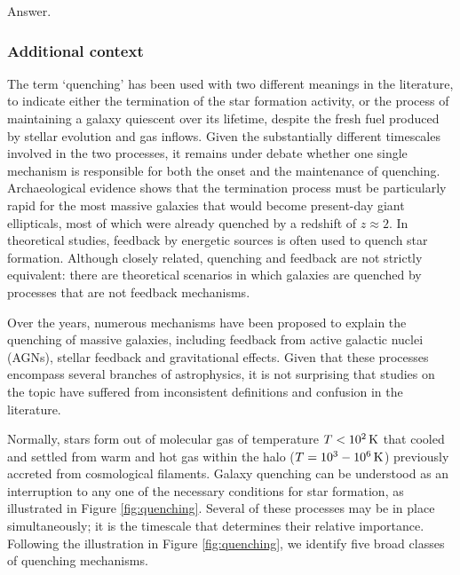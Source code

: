 \documentclass[a4paper,11pt]{article}
\begin{document}
Answer.

\subsubsection{Additional context}

The term `quenching' has been used with two different meanings in the literature, to indicate either the termination of the star formation activity, or the process of maintaining a galaxy quiescent over its lifetime, despite the fresh fuel produced by stellar evolution and gas inflows. Given the substantially different timescales involved in the two processes, it remains under debate whether one single mechanism is responsible for both the onset and the maintenance of quenching. Archaeological evidence shows that the termination process must be particularly rapid for the most massive galaxies that would become present-day giant ellipticals, most of which were already quenched by a redshift of $z\approx2$. In theoretical studies, feedback by energetic sources is often used to quench star formation. Although closely related, quenching and feedback are not strictly equivalent: there are theoretical scenarios in which galaxies are quenched by processes that are not feedback mechanisms.

{\noindent}Over the years, numerous mechanisms have been proposed to explain the quenching of massive galaxies, including feedback from active galactic nuclei (AGNs), stellar feedback and gravitational effects. Given that these processes encompass several branches of astrophysics, it is not surprising that studies on the topic have suffered from inconsistent definitions and confusion in the literature.

{\noindent}Normally, stars form out of molecular gas of temperature $T<10^2\,{\rm K}$ that cooled and settled from warm and hot gas within the halo ($T=10^3-10^6\,{\rm K}$) previously accreted from cosmological filaments. Galaxy quenching can be understood as an interruption to any one of the necessary conditions for star formation, as illustrated in Figure \ref{fig:quenching}. Several of these processes may be in place simultaneously; it is the timescale that determines their relative importance. Following the illustration in Figure \ref{fig:quenching}, we identify five broad classes of quenching mechanisms.
\end{document}
